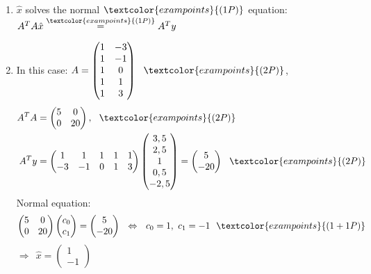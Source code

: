 {\color{solution}
\begin{enumerate}
	\item 
	$\hat{x}$ solves the normal $\textcolor{exampoints}{(1P)}$ equation: $A^TA\hat{x}\stackrel{\textcolor{exampoints}{(1P)}}{=}A^Ty$
	\item 
	In this case: $A=\begin{pmatrix}1&-3\\1&-1\\1&0\\1&1\\1&3\end{pmatrix}~~\textcolor{exampoints}{(2P)}$,
	\begin{align*}
	A^TA&=\begin{pmatrix}5&0\\0&20\end{pmatrix},~~\textcolor{exampoints}{(2P)}\\
	A^Ty&=\begin{pmatrix}1&1&1&1&1\\-3&-1&0&1&3\end{pmatrix}
	\begin{pmatrix}3,5\\2,5\\1\\0,5\\-2,5\end{pmatrix}
	=\begin{pmatrix}5\\-20\end{pmatrix}~~\textcolor{exampoints}{(2P)}
	\end{align*}
	Normal equation: $$\begin{pmatrix}5&0\\0&20\end{pmatrix}\begin{pmatrix}c_0\\c_1\end{pmatrix}
	=\begin{pmatrix}5\\-20\end{pmatrix}
	~~\Leftrightarrow~~c_0=1,~c_1=-1~~\textcolor{exampoints}{(1+1P)}$$
	$\Rightarrow~~\hat{x}=\begin{pmatrix}1\\-1\end{pmatrix}$
\end{enumerate}
}